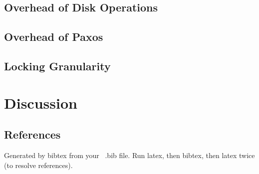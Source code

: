 \documentclass{vldb}
\begin{document}
\subsection{Overhead of Disk Operations}

\subsection{Overhead of Paxos}

\subsection{Locking Granularity}


\section{Discussion}




\subsection{References}
Generated by bibtex from your ~.bib file.  Run latex,
then bibtex, then latex twice (to resolve references).
\end{document}

